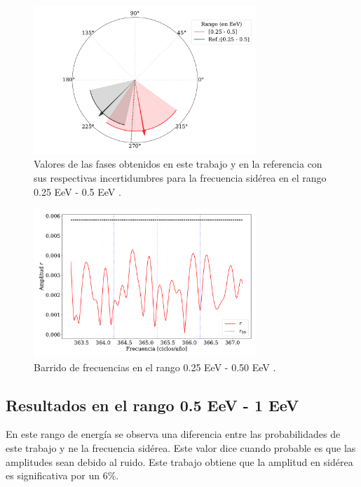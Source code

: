 \documentclass[11pt,papel,oneside,singlespace]{ibtesis}
\begin{document}
\begin{figure}[H]
    \begin{small}
        \begin{center}
            \includegraphics[width=0.75\textwidth]{phase_primer_bin.pdf}
        \end{center}
        \caption{Valores de las fases obtenidos en este trabajo y en la referencia con sus respectivas incertidumbres para la frecuencia sidérea en el  rango 0.25 EeV - 0.5 EeV .}
        \label{fig:primer}
    \end{small}
\end{figure}

\begin{figure}[H]
    \begin{small}
        \begin{center}
            \includegraphics[width=0.75\textwidth]{plot_bin_1_barrido_v2.pdf}
        \end{center}
        \caption{Barrido de frecuencias en el  rango 0.25 EeV - 0.50 EeV .}
        \label{fig:primer_barrido}
    \end{small}
\end{figure}

\subsection{Resultados en el rango 0.5 EeV - 1 EeV}
En este rango de energía se observa una diferencia entre las probabilidades de este trabajo y \cite{Aab_2020}  ne la frecuencia sidérea. Este valor dice cuando probable es que las amplitudes sean debido al ruido. Este trabajo obtiene que la amplitud en sidérea es significativa por un  $6\%$.  
\end{document}
